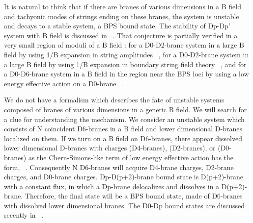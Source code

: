 \documentclass[a4paper,12pt]{article}
\providecommand{\tr}{\mbox{tr}}
\begin{document}
 It is natural to think that if there are branes of various dimensions in a B field and tachyonic modes of strings ending on these branes, the system is unstable and decays to a stable system, a BPS bound state. The stability of Dp-Dp' system with B field is discussed in ~\cite{p-p'}. That conjecture is partially verified in a very small region of moduli of a B field : for a D0-D2-brane system in a large B field by using 1/B expansion in string amplitudes ~\cite{narain}, for a D0-D2-brane system in a large B field by using 1/B expansion in boundary string field theory ~\cite{david}, and for a D0-D6-brane system in a B field in the region near the BPS loci by using a low energy effective action on a D0-brane ~\cite{park, witten}. 
 
 We do not have a formalism which describes the fate of unstable systems composed of branes of various dimensions in a generic B field. We will search for a clue for understanding the mechanism. We consider an unstable system which consists of N coincident D6-branes in a B field and lower dimensional D-branes localized on them. If we turn on a B field on D6-branes, there appear dissolved lower dimensional D-branes with charges \coordHE{} (D4-branes), \coordHE{} (D2-branes), or \coordHE{} (D0-branes) as the Chern-Simons-like term of low energy effective action has the form, \myHighlight{$i \mu_p \int_{p+1} \tr(\exp(2 \pi \alpha'F_2 + B_2) \wedge \Sigma_q C_q)$}\coordHE{} ~\cite{instanton, within, jabbari0-2}. Consequently N D6-branes will acquire D4-brane charges, D2-brane charges, and D0-brane charges. Dp-D(p+2)-brane bound state is D(p+2)-brane with a constant flux, in which a Dp-brane delocalizes and dissolves in a D(p+2)-brane. Therefore, the final state will be a BPS bound state, made of D6-branes with dissolved lower dimensional branes. The D0-Dp bound states are discussed recently in ~\cite{p-cycle, ohta}.
 
\end{document}
